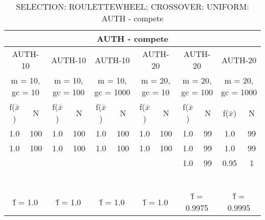 \begin{table}[H]
	\centering
	\caption{SELECTION: ROULETTEWHEEL; CROSSOVER: UNIFORM: AUTH - compete}
	\begin{adjustbox}{width=1\textwidth}
		\begin{tabular}{ |c|c||c|c||c|c||c|c||c|c||c|c| }
			\hline
			\multicolumn{12}{|c|}{AUTH - compete} \\
			\hline
			\multicolumn{2}{|c||}{AUTH-10} & \multicolumn{2}{c||}{AUTH-10} & \multicolumn{2}{c||}{AUTH-10} & \multicolumn{2}{c||}{AUTH-20} & \multicolumn{2}{c||}{AUTH-20} & \multicolumn{2}{c|}{AUTH-20}\\
			\hline
			\multicolumn{2}{|c||}{m = 10, gc = 10} & \multicolumn{2}{c||}{m = 10, gc = 100} & \multicolumn{2}{c||}{m = 10, gc = 1000} & \multicolumn{2}{c||}{m = 20, gc = 10} & \multicolumn{2}{c||}{m = 20, gc = 100} & \multicolumn{2}{c|}{m = 20, gc = 1000}\\
			\hline
			f($\bar{x}$) & N & f($\bar{x}$) & N & f($\bar{x}$) & N & f($\bar{x}$) & N & f($\bar{x}$) & N & f($\bar{x}$) & N\\
			\hline
			\hline
			1.0 & 100 & 1.0 & 100 & 1.0 & 100 & 1.0 & 100 & 1.0 & 99 & 1.0 & 99\\
			\hline
			1.0 & 100 & 1.0 & 100 & 1.0 & 100 & 1.0 & 100 & 1.0 & 99 & 1.0 & 99\\
			&   &   &   &   &   &   &   & 1.0 & 99 & 0.95 & 1\\
			&   &   &   &   &   &   &   &   &   &   &  \\
			&   &   &   &   &   &   &   &   &   &   &  \\
			&   &   &   &   &   &   &   &   &   &   &  \\
			&   &   &   &   &   &   &   &   &   &   &  \\
			&   &   &   &   &   &   &   &   &   &   &  \\
			&   &   &   &   &   &   &   &   &   &   &  \\
			\hline
			\multicolumn{2}{|c||}{\^{f} = 1.0} & \multicolumn{2}{c||}{\^{f} = 1.0} & \multicolumn{2}{c||}{\^{f} = 1.0} & \multicolumn{2}{c||}{\^{f} = 1.0} & \multicolumn{2}{c||}{\^{f} = 0.9975} & \multicolumn{2}{c|}{\^{f} = 0.9995}\\
			\hline
		\end{tabular}
	\end{adjustbox}
\end{table}
